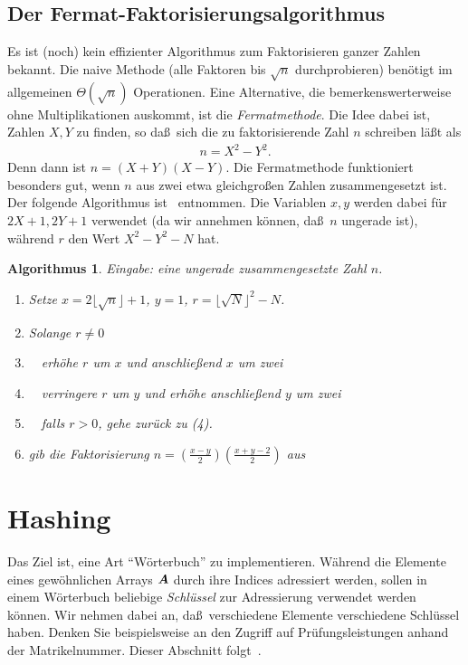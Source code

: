 \documentclass[10pt,reqno]{amsart}
\numberwithin{equation}{section}
\newcommand\vA{\vec A}
\def\vec#1{\mathchoice{\mbox{\boldmath$\displaystyle#1$}}
{\mbox{\boldmath$\textstyle#1$}}
{\mbox{\boldmath$\scriptstyle#1$}}
{\mbox{\boldmath$\scriptscriptstyle#1$}}}
\newtheorem{algorithm}[definition]{Algorithmus}
\newcommand\bc[1]{\left({#1}\right)}
\newcommand\bcfr[2]{\bc{\frac{#1}{#2}}}
\begin{document}
\subsection{Der Fermat-Faktorisierungsalgorithmus}\label{sec_fermat}
Es ist (noch) kein effizienter Algorithmus zum Faktorisieren ganzer Zahlen bekannt.
Die naive Methode (alle Faktoren bis $\sqrt n$ durchprobieren) ben\"otigt im allgemeinen $\Theta(\sqrt n)$ Operationen.
Eine Alternative, die bemerkenswerterweise ohne Multiplikationen auskommt, ist die {\em Fermatmethode}.
Die Idee dabei ist, Zahlen $X,Y$ zu finden, so da\ss\ sich die zu faktorisierende Zahl $n$ schreiben l\"a\ss t als
\begin{align*}
	n=X^2-Y^2.
\end{align*}
Denn dann ist $n=(X+Y)(X-Y)$.
Die Fermatmethode funktioniert besonders gut, wenn $n$ aus zwei etwa gleichgro\ss en Zahlen zusammengesetzt ist.
Der folgende Algorithmus ist~\cite{Knuth} entnommen.
Die Variablen $x,y$ werden dabei f\"ur $2X+1,2Y+1$ verwendet (da wir annehmen k\"onnen, da\ss\ $n$ ungerade ist), w\"ahrend $r$ den Wert $X^2-Y^2-N$ hat.

\begin{algorithm}\label{alg_fermat}
	{\em Eingabe:} eine ungerade zusammengesetzte Zahl $n$.
	\begin{enumerate}
		\item Setze $x=2\lfloor\sqrt n\rfloor+1$, $y=1$, $r=\lfloor\sqrt N\rfloor^2-N$.
		\item Solange $r\neq0$
		\item $\quad$erh\"ohe $r$ um $x$ und anschlie\ss end $x$ um zwei
		\item $\quad$verringere $r$ um $y$ und erh\"ohe anschlie\ss end $y$ um zwei
		\item $\quad$falls $r>0$, gehe zur\"uck zu (4).
		\item gib die Faktorisierung $n=\bcfr{x-y}2\bcfr{x+y-2}2$ aus
	\end{enumerate}
\end{algorithm}

\section{Hashing}\label{sec_hash}

Das Ziel ist, eine Art ``W\"orterbuch'' zu implementieren.
W\"ahrend die Elemente eines gew\"ohnlichen Arrays $\vA$ durch ihre Indices adressiert werden, sollen in einem W\"orterbuch beliebige {\em Schl\"ussel} zur Adressierung verwendet werden k\"onnen.
Wir nehmen dabei an, da\ss\ verschiedene Elemente verschiedene Schl\"ussel haben.
Denken Sie beispielsweise an den Zugriff auf Pr\"ufungsleistungen anhand der Matrikelnummer.
Dieser Abschnitt folgt~\cite{Cormen}.
\end{document}
